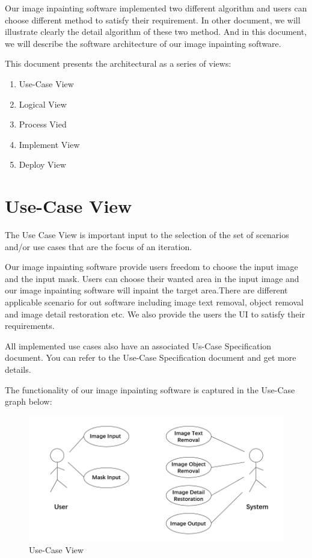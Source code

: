 \documentclass[12pt]{article}
\begin{document}
Our image inpainting software implemented two different algorithm and users can choose different method to satisfy their requirement. In other document, we will illustrate clearly the detail algorithm of these two method. And in this document, we will describe the software architecture of our image inpainting software.

This document presents the architectural as a series of views:

\begin{enumerate}
	\item Use-Case View
	\item Logical View
	\item Process Vied
	\item Implement View
	\item Deploy View
\end{enumerate}


\section{Use-Case View}
\qquad The Use Case View is important input to the selection of the set of scenarios and/or use cases that are the focus of an iteration. 

Our image inpainting software provide users freedom to choose the input image and the input mask. Users can choose their wanted area in the input image and our image inpainting software will inpaint the target area.There are different applicable scenario for out software including image text removal, object removal and image detail restoration etc. We also provide the users the UI to satisfy their requirements. 

All implemented use cases also have an associated Us-Case Specification document. You can refer to the Use-Case Specification document and get more details.

The functionality of our image inpainting software is captured in the Use-Case graph below:
\begin{figure}[H]
	\centering
	\includegraphics[width=1.0\linewidth]{use-case.jpg}
	\caption{Use-Case View}
\end{figure}
\end{document}
